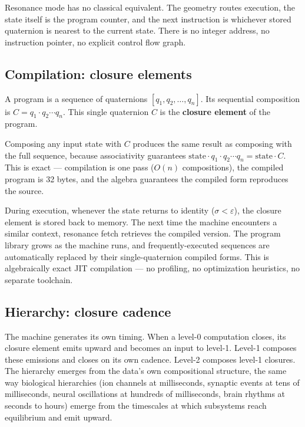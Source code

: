 \documentclass[12pt,a4paper]{article}
\begin{document}
Resonance mode has no classical equivalent. The geometry routes execution, the state itself is the program counter, and the next instruction is whichever stored quaternion is nearest to the current state. There is no integer address, no instruction pointer, no explicit control flow graph.

\subsection{Compilation: closure elements}

A program is a sequence of quaternions $[q_1, q_2, \ldots, q_n]$. Its sequential composition is $C = q_1 \cdot q_2 \cdots q_n$. This single quaternion $C$ is the \textbf{closure element} of the program.

Composing any input state with $C$ produces the same result as composing with the full sequence, because associativity guarantees $\text{state} \cdot q_1 \cdot q_2 \cdots q_n = \text{state} \cdot C$. This is exact --- compilation is one pass ($O(n)$ compositions), the compiled program is 32 bytes, and the algebra guarantees the compiled form reproduces the source.

During execution, whenever the state returns to identity ($\sigma < \varepsilon$), the closure element is stored back to memory. The next time the machine encounters a similar context, resonance fetch retrieves the compiled version. The program library grows as the machine runs, and frequently-executed sequences are automatically replaced by their single-quaternion compiled forms. This is algebraically exact JIT compilation --- no profiling, no optimization heuristics, no separate toolchain.

\subsection{Hierarchy: closure cadence}

The machine generates its own timing. When a level-0 computation closes, its closure element emits upward and becomes an input to level-1. Level-1 composes these emissions and closes on its own cadence. Level-2 composes level-1 closures. The hierarchy emerges from the data's own compositional structure, the same way biological hierarchies (ion channels at milliseconds, synaptic events at tens of milliseconds, neural oscillations at hundreds of milliseconds, brain rhythms at seconds to hours) emerge from the timescales at which subsystems reach equilibrium and emit upward.
\end{document}
